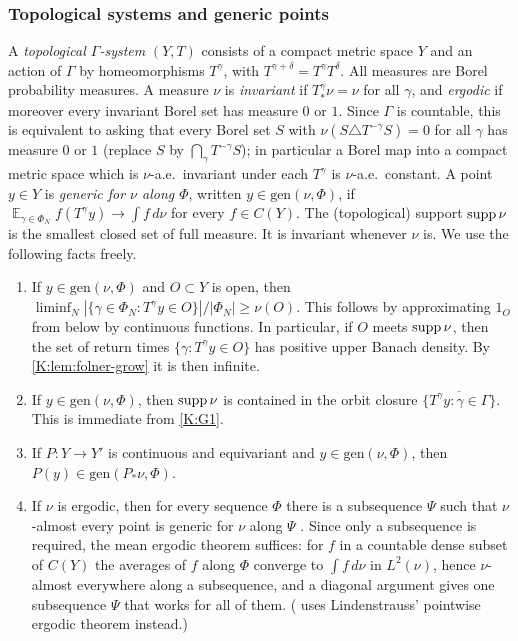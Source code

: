 \subsubsection*{Topological systems and generic points}
A \emph{topological $\Gamma$-system} $(Y,T)$ consists of a compact metric space $Y$ and an
action of $\Gamma$ by homeomorphisms $T^\gamma$, with $T^{\gamma+\delta}=T^\gamma T^\delta$.
All measures are Borel probability measures.
A measure $\nu$ is \emph{invariant} if $T^\gamma_*\nu=\nu$ for all $\gamma$, and
\emph{ergodic} if moreover every invariant Borel set has measure $0$ or $1$.
Since $\Gamma$ is countable, this is equivalent to asking that every Borel set $S$ with
$\nu(S\triangle T^{-\gamma}S)=0$ for all $\gamma$ has measure $0$ or $1$ (replace $S$ by
$\bigcap_{\gamma}T^{-\gamma}S$); in particular a Borel map into a compact metric space
which is $\nu$-a.e.\ invariant under each $T^\gamma$ is $\nu$-a.e.\ constant.
A point $y\in Y$ is \emph{generic for $\nu$ along $\Phi$}, written $y\in\mathrm{gen}(\nu,\Phi)$,
if $\mathop{\mathbb E}_{\gamma\in\Phi_N}f(T^\gamma y)\to\int f\,d\nu$ for every $f\in C(Y)$.
The (topological) support $\operatorname{supp}\nu$ is the smallest closed set of full measure. It is
invariant whenever $\nu$ is.
We use the following facts freely.
\begin{enumerate}[label=(G\arabic*)]
\item\label{K:G1} If $y\in\mathrm{gen}(\nu,\Phi)$ and $O\subset Y$ is open, then
$\liminf_N|\{\gamma\in\Phi_N:T^\gamma y\in O\}|/|\Phi_N|\ge\nu(O)$.
This follows by approximating $1_O$ from below by continuous functions.
In particular, if $O$ meets $\operatorname{supp}\nu$, then the set of return times
$\{\gamma:T^\gamma y\in O\}$ has positive upper Banach density. By \cref{K:lem:folner-grow}
it is then infinite.
\item\label{K:G2} If $y\in\mathrm{gen}(\nu,\Phi)$, then $\operatorname{supp}\nu$ is contained in the orbit closure
$\overline{\{T^\gamma y:\gamma\in\Gamma\}}$. This is immediate from \ref{K:G1}.
\item\label{K:G3} If $P\colon Y\to Y'$ is continuous and equivariant and
$y\in\mathrm{gen}(\nu,\Phi)$, then $P(y)\in\mathrm{gen}(P_*\nu,\Phi)$.
\item\label{K:G4} If $\nu$ is ergodic, then for every \Fol{} sequence $\Phi$ there is a
subsequence $\Psi$ such that $\nu$-almost every point is generic for $\nu$ along $\Psi$
\cite[Lemma~2.7]{charamaras2024finding}. Since only a subsequence is required, the mean ergodic
theorem suffices: for $f$ in a countable dense subset of $C(Y)$ the averages of $f$ along $\Phi$
converge to $\int f\,d\nu$ in $L^2(\nu)$, hence $\nu$-almost everywhere along a subsequence,
and a diagonal argument gives one subsequence $\Psi$ that works for all of them.
(\cite{charamaras2024finding} uses Lindenstrauss' pointwise ergodic theorem instead.)
\end{enumerate}

